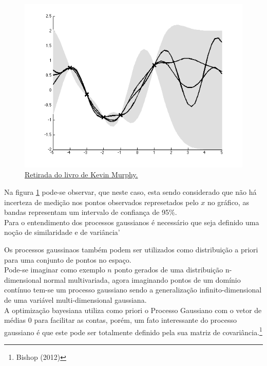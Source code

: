 \documentclass[
	12pt,				%
	openright,			%
	twoside,			%
	a4paper,			%
	english,			%
	french,				%
	spanish,			%
	brazil,				%
]{abntex2}
\begin{document}
\begin{figure}
\centering
\includegraphics[width=\textwidth,height=0.3\textheight]{images/gp.png}
\caption{\href{https://github.com/probml/pmtk3/blob/30d7a1952f3979b16e92dbfa4cd1ce0e402cf7d8/docs/demoOutput/bookDemos/(15)-Gaussian_processes/gprDemoNoiseFree_02.png}{Retirada
do livro de Kevin Murphy.\label{gp}}}
\end{figure}

Na figura \ref{gp} pode-se observar, que neste caso, esta sendo
considerado que não há incerteza de medição nos pontos observados
represetados pelo \(x\) no gráfico, as bandas representam um intervalo
de confiança de 95\%.\\

Para o entendimento dos processos gaussianos é necessário que seja
definido uma noção de similaridade e de variância'

Os processos gaussinaos também podem ser utilizados como distribuição a
priori para uma conjunto de pontos no espaço.\\

Pode-se imaginar como exemplo \(n\) ponto gerados de uma distribuição
n-dimensional normal multivariada, agora imaginando pontos de um domínio
contínuo tem-se um processo gaussiano sendo a generalização
infinito-dimensional de uma variável multi-dimensional gaussiana.\\

A optimização bayesiana utiliza como priori o Processo Gaussiano com o
vetor de médias 0 para facilitar as contas, porém, um fato interessante
do processo gaussiano é que este pode ser totalmente definido pela sua
matriz de covariância.\footnote{Bishop (2012)}\\
\end{document}
